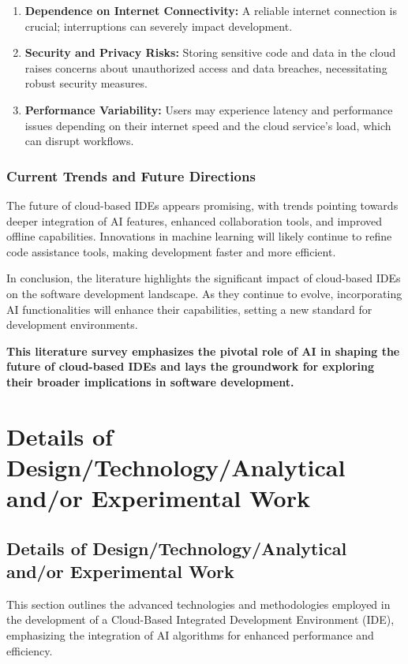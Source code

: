 \documentclass[12pt,a4paper,final]{report}
\begin{document}
\begin{enumerate}
    \item \textbf{Dependence on Internet Connectivity:} A reliable internet connection is crucial; interruptions can severely impact development.
    \item \textbf{Security and Privacy Risks:} Storing sensitive code and data in the cloud raises concerns about unauthorized access and data breaches, necessitating robust security measures.
    \item \textbf{Performance Variability:} Users may experience latency and performance issues depending on their internet speed and the cloud service's load, which can disrupt workflows.
\end{enumerate}

\subsection{Current Trends and Future Directions}
The future of cloud-based IDEs appears promising, with trends pointing towards deeper integration of AI features, enhanced collaboration tools, and improved offline capabilities. Innovations in machine learning will likely continue to refine code assistance tools, making development faster and more efficient.



In conclusion, the literature highlights the significant impact of cloud-based IDEs on the software development landscape. As they continue to evolve, incorporating AI functionalities will enhance their capabilities, setting a new standard for development environments.

\textbf{This literature survey emphasizes the pivotal role of AI in shaping the future of cloud-based IDEs and lays the groundwork for exploring their broader implications in software development.} 
\chapter{Details of Design/Technology/Analytical and/or Experimental Work }
\newpage
\section{Details of Design/Technology/Analytical and/or Experimental Work}

This section outlines the advanced technologies and methodologies employed in the development of a Cloud-Based Integrated Development Environment (IDE), emphasizing the integration of AI algorithms for enhanced performance and efficiency.
\end{document}
